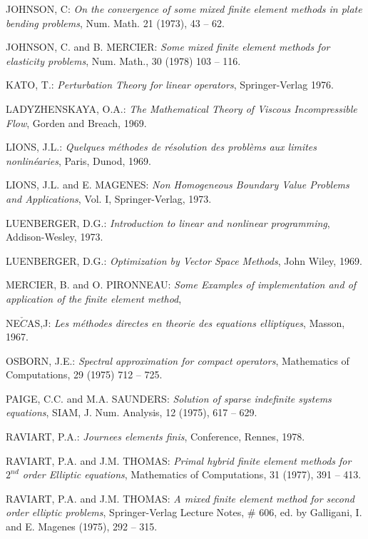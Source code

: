 \begin{thebibliography}{99}
 JOHNSON, C: \emph{On the convergence of some mixed
  finite element methods in plate bending problems}, Num. Math. 21
  (1973), 43 -- 62.

 JOHNSON, C. and B. MERCIER: \emph{Some mixed finite
  element methods for elasticity problems}, Num. Math., 30 (1978) 103
  -- 116.

 KATO, T.: \emph{Perturbation Theory for linear
  operators}, Springer-Verlag 1976.

 LADYZHENSKAYA, O.A.: \emph{The Mathematical Theory of
  Viscous Incompressible Flow}, Gorden and Breach, 1969.

 LIONS, J.L.: \emph{Quelques m\'ethodes de r\'esolution
  des probl\`ems aux limites nonlin\'earies}, Paris, Dunod, 1969.

 LIONS, J.L. and E. MAGENES: \emph{Non Homogeneous
  Boundary Value Problems and Applications}, Vol. I, Springer-Verlag,
  1973.

 LUENBERGER, D.G.: \emph{Introduction to linear and
  nonlinear programming}, Addison-Wesley, 1973.

 LUENBERGER, D.G.: \emph{Optimization by Vector Space
  Methods}, John Wiley, 1969.

 MERCIER, B. and O. PIRONNEAU: \emph{Some Examples of
  implementation and of application of the finite element method},

 NE$\check{C}$AS,\pageoriginale J: \emph{Les m\'ethodes
  directes en theorie des equations elliptiques}, Masson, 1967.

 OSBORN, J.E.: \emph{Spectral approximation for compact
  operators}, Mathematics of Computations, 29 (1975) 712 -- 725.

 PAIGE, C.C. and M.A. SAUNDERS: \emph{Solution of
  sparse indefinite systems equations}, SIAM, J. Num. Analysis, 12
  (1975), 617 -- 629.

 RAVIART, P.A.: \emph{Journees elements finis},
  Conference, Rennes, 1978.

 RAVIART, P.A. and J.M. THOMAS: \emph{Primal hybrid
  finite element methods for $2^{nd}$ order Elliptic equations},
  Mathematics of Computations, 31 (1977), 391 -- 413.

 RAVIART, P.A. and J.M. THOMAS: \emph{A mixed finite
  element method for second order elliptic problems}, Springer-Verlag
  Lecture Notes, \# 606, ed. by Galligani, I. and E. Magenes (1975),
  292 -- 315.


\end{thebibliography}
